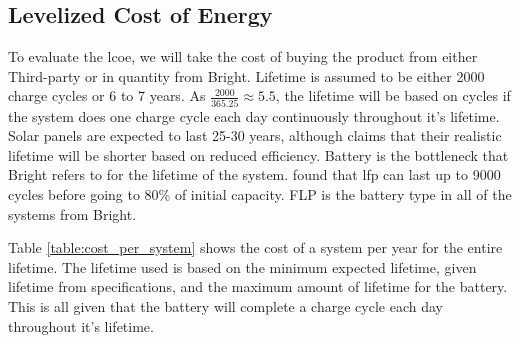 \subsection{Levelized Cost of Energy}
\label{chap:method:sec:LCOE}
To evaluate the \acrshort{lcoe}, we will take the cost of buying the product from either Third-party or in quantity from Bright. Lifetime is assumed to be either 2000 charge cycles or 6 to 7 years. As $\frac{2000}{365.25} \approx 5.5$, the lifetime will be based on cycles if the system does one charge cycle each day continuously throughout it's lifetime. Solar panels are expected to last 25-30 years, although \citep{sodhiEconomicLifetimesSolar2022} claims that their realistic lifetime will be shorter based on reduced efficiency. Battery is the bottleneck that Bright refers to for the lifetime of the system. \citep{pregerDegradationCommercialLithiumIon2020} found that \acrfull{lfp} can last up to 9000 cycles before going to 80\% of initial capacity. FLP is the battery type in all of the systems from Bright.


Table \ref{table:cost_per_system} shows the cost of a system per year for the entire lifetime. The lifetime used is based on the minimum expected lifetime, given lifetime from specifications, and the maximum amount of lifetime for the battery. This is all given that the battery will complete a charge cycle each day throughout it's lifetime. 

